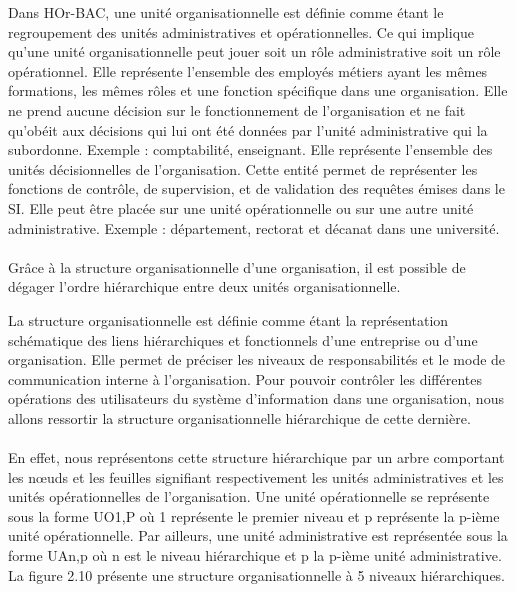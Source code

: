 Dans HOr-BAC, une unité organisationnelle est définie comme étant le regroupement des unités administratives et opérationnelles. Ce qui implique qu'une unité organisationnelle peut jouer soit un rôle administrative soit un rôle opérationnel.
\label{sectionUnitéOpérationnelle}
Elle représente l'ensemble des employés métiers ayant les mêmes formations, les mêmes rôles et une fonction spécifique dans une organisation. Elle ne prend aucune décision sur le fonctionnement de l'organisation et ne fait qu'obéit aux décisions qui lui ont été données par l'unité administrative qui la subordonne. Exemple : comptabilité, enseignant. 
\label{sectionUnitéAdministrative}
Elle représente l'ensemble des unités décisionnelles de l'organisation. Cette entité permet de représenter les fonctions de contrôle, de supervision, et de validation des requêtes émises dans le SI. Elle peut être placée sur une unité opérationnelle ou sur une autre unité administrative. Exemple : département, rectorat et décanat dans une université.
\paragraph{}Grâce à la structure organisationnelle d'une organisation, il est possible de dégager l'ordre hiérarchique entre deux unités organisationnelle.

\label{sectionStructureOrg}

La structure organisationnelle est définie comme étant la représentation schématique des liens hiérarchiques et fonctionnels d'une entreprise ou d'une organisation. Elle permet de préciser les niveaux de responsabilités et le mode de communication interne à l'organisation. Pour pouvoir contrôler les différentes opérations des utilisateurs du système d'information dans une organisation, nous allons ressortir la structure organisationnelle hiérarchique de cette dernière.
\paragraph{} En effet, nous représentons cette structure hiérarchique par un arbre comportant les nœuds et les feuilles signifiant respectivement les unités administratives et les unités opérationnelles de l'organisation. Une unité opérationnelle se représente sous la forme UO1,P où 1 représente le premier niveau et p représente la p-ième unité opérationnelle. Par ailleurs, une unité administrative est représentée sous la forme UAn,p où n est le niveau hiérarchique et p la p-ième unité administrative. La figure 2.10 présente une structure organisationnelle à 5 niveaux hiérarchiques.

